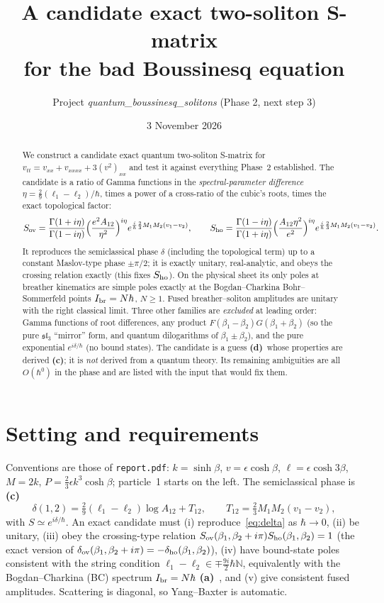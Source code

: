 \documentclass[11pt,a4paper]{article}
\title{A candidate exact two-soliton S-matrix\\ for the bad Boussinesq equation}
\author{Project \emph{quantum\_boussinesq\_solitons} (Phase 2, next step 3)}
\date{3 November 2026}
\newcommand{\La}{\textsf{\textbf{(a)}}}
\newcommand{\Lc}{\textsf{\textbf{(c)}}}
\newcommand{\Ld}{\textsf{\textbf{(d)}}}
\theoremstyle{remark}\newtheorem{remark}[proposition]{Remark}
\begin{document}
\maketitle

\begin{abstract}
We construct a candidate exact quantum two-soliton S-matrix for $v_{tt}=v_{xx}+v_{xxxx}+3(v^2)_{xx}$ and test it against everything Phase~2 established. The candidate is a ratio of Gamma functions in the \emph{spectral-parameter difference} $\eta=\tfrac29(\ell_1-\ell_2)/\hbar$, times a power of a cross-ratio of the cubic's roots, times the exact topological factor:
\[
S_{\rm ov}=\frac{\Gamma(1+i\eta)}{\Gamma(1-i\eta)}\Big(\frac{e^2A_{12}}{\eta^2}\Big)^{i\eta}e^{\frac{i}{\hbar}\frac23M_1M_2(v_1-v_2)},\qquad
S_{\rm ho}=\frac{\Gamma(1-i\eta)}{\Gamma(1+i\eta)}\Big(\frac{A_{12}\eta^2}{e^2}\Big)^{i\eta}e^{\frac{i}{\hbar}\frac23M_1M_2(v_1-v_2)} .
\]
It reproduces the semiclassical phase $\delta$ (including the topological term) up to a constant Maslov-type phase $\pm\pi/2$; it is exactly unitary, real-analytic, and obeys the crossing relation exactly (this fixes $S_{\rm ho}$). On the physical sheet its only poles at breather kinematics are simple poles exactly at the Bogdan--Charkina Bohr--Sommerfeld points $I_{\rm br}=N\hbar$, $N\ge1$. Fused breather--soliton amplitudes are unitary with the right classical limit. Three other families are \emph{excluded} at leading order: Gamma functions of root differences, any product $F(\beta_1-\beta_2)G(\beta_1+\beta_2)$ (so the pure $\mathfrak{sl}_3$ ``mirror'' form, and quantum dilogarithms of $\beta_1\pm\beta_2$), and the pure exponential $e^{i\delta/\hbar}$ (no bound states). The candidate is a guess \Ld\ whose properties are derived \Lc; it is \emph{not} derived from a quantum theory. Its remaining ambiguities are all $O(\hbar^0)$ in the phase and are listed with the input that would fix them.
\end{abstract}
\tableofcontents

\section{Setting and requirements}
Conventions are those of \texttt{report.pdf}: $k=\sinh\beta$, $v=\epsilon\cosh\beta$, $\ell=\epsilon\cosh3\beta$, $M=2k$, $P=\tfrac23\epsilon k^3\cosh\beta$; particle~1 starts on the left. The semiclassical phase is \Lc
\begin{equation}\label{eq:delta}
\delta(1,2)=\tfrac29(\ell_1-\ell_2)\log A_{12}+T_{12},\qquad T_{12}=\tfrac23M_1M_2(v_1-v_2),
\end{equation}
with $S\simeq e^{i\delta/\hbar}$. An exact candidate must (i) reproduce~\eqref{eq:delta} as $\hbar\to0$, (ii) be unitary, (iii) obey the crossing-type relation $S_{\rm ov}(\beta_1,\beta_2+i\pi)S_{\rm ho}(\beta_1,\beta_2)=1$ (the exact version of $\delta_{\rm ov}(\beta_1,\beta_2+i\pi)=-\delta_{\rm ho}(\beta_1,\beta_2)$), (iv) have bound-state poles consistent with the string condition $\ell_1-\ell_2\in\mp\tfrac{9i}2\hbar\mathbb N$, equivalently with the Bogdan--Charkina (BC) spectrum $I_{\rm br}=N\hbar$ \La~\cite{BC}, and (v) give consistent fused amplitudes. Scattering is diagonal, so Yang--Baxter is automatic.
\end{document}
